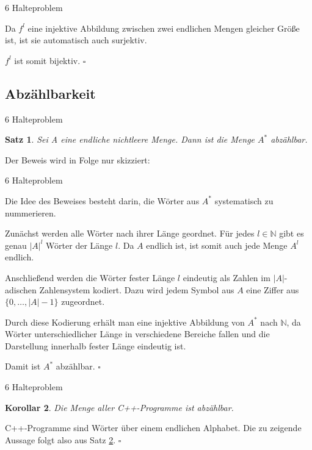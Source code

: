 \documentclass{beamer}
\newcommand{\N}{\mathbb{N}}%
\newcommand{\beweis}[1]{\textbf{\structure{Beweis~#1.}}}
\newtheorem{thm}{Satz}
\newtheorem{cor}[thm]{Korollar}
\begin{document}
\begin{frame}{6 Halteproblem}

Da $f^l$ eine injektive Abbildung zwischen zwei endlichen Mengen gleicher Größe ist, ist sie automatisch auch surjektiv.

\vspace{0.5em}

$f^l$ ist somit bijektiv. %
\hfill$\square$
    
\end{frame}

\subsection{Abzählbarkeit}
\begin{frame}{6 Halteproblem}

    \begin{thm}
    Sei A eine endliche nichtleere Menge. Dann ist die Menge $A^*$ abzählbar.
\end{thm}
\vspace{0.5em}
Der Beweis wird in Folge nur skizziert:
\end{frame}

\begin{frame}{6 Halteproblem}

    

\beweis{3}
Die Idee des Beweises besteht darin, die Wörter aus $A^*$ systematisch zu nummerieren.

Zunächst werden alle Wörter nach ihrer Länge geordnet. Für jedes $l \in \N$ gibt es genau $|A|^l$ Wörter der Länge $l$. Da $A$ endlich ist, ist somit auch jede Menge $A^l$ endlich.

Anschließend werden die Wörter fester Länge $l$ eindeutig als Zahlen im $|A|$-adischen Zahlensystem kodiert. Dazu wird jedem Symbol aus $A$ eine Ziffer aus $\{0,\dots,|A|-1\}$ zugeordnet.

Durch diese Kodierung erhält man eine injektive Abbildung von $A^*$ nach $\N$, da Wörter unterschiedlicher Länge in verschiedene Bereiche fallen und die Darstellung innerhalb fester Länge eindeutig ist.

Damit ist $A^*$ abzählbar.
\hfill$\square$
\end{frame}

\begin{frame}{6 Halteproblem}

\begin{cor}
\label{abzählbar}
    Die Menge aller C++-Programme ist abzählbar.
\end{cor}

\beweis{4}
    C++-Programme sind Wörter über einem endlichen Alphabet. Die zu zeigende Aussage folgt also aus Satz \ref{abzählbar}.  
    \hfill$\square$
\end{frame}
\end{document}
